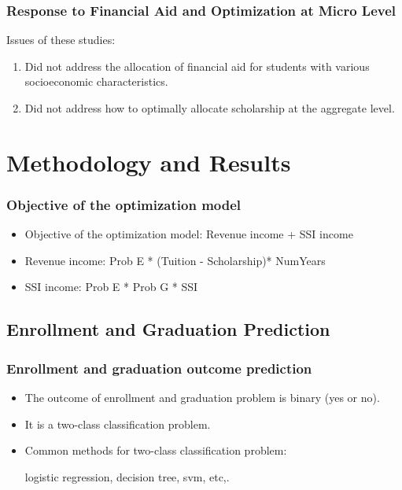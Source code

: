 \documentclass[aspectratio=169]{beamer}
\begin{document}
\begin{frame}
   \frametitle{Response to Financial Aid and Optimization at Micro Level}
 
 Issues of these studies:
 
 \begin{enumerate}
\item Did not address the allocation of financial aid for students with 
various socioeconomic characteristics.
\item Did not address how to optimally allocate scholarship at the
aggregate level.
 \end{enumerate}

\end{frame}


\section{Methodology and Results}


\begin{frame}
\frametitle{Objective of the optimization model}
\begin{itemize}
  \item   Objective of the optimization model: 
  Revenue income + SSI income
 \item Revenue income:
  Prob E * (Tuition - Scholarship)* NumYears

\item SSI income:
  Prob E * Prob G * SSI
\end{itemize}

\end{frame}





\subsection{Enrollment and Graduation Prediction}
\begin{frame}
    \frametitle{Enrollment and graduation outcome prediction}
    \begin{itemize}
      \item The outcome of enrollment and graduation problem is binary (yes or
no). 
\item It is a two-class classification problem.
\item  Common methods for two-class classification problem:

logistic regression, decision tree, svm, etc,.
    \end{itemize}



\end{frame}
\end{document}
